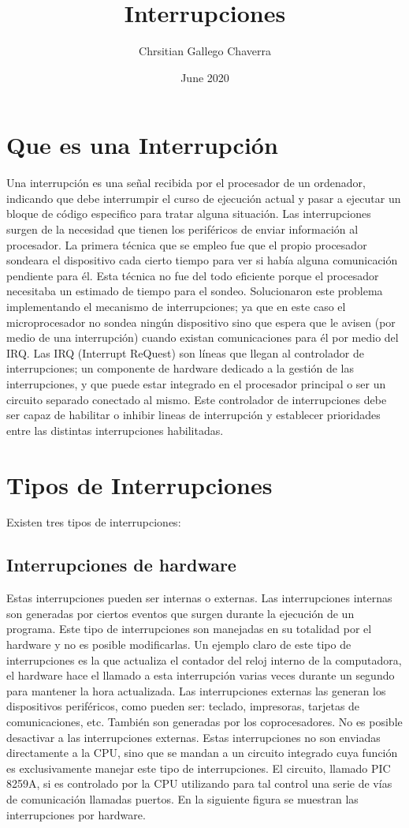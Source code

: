 \documentclass{article}
\title{Interrupciones}
\author{Chrsitian Gallego Chaverra}
\date{June 2020}
\begin{document}
\maketitle

\section{Que es una Interrupción}
Una interrupción es una señal recibida por el procesador de un ordenador, indicando que debe interrumpir el curso de ejecución actual y pasar a ejecutar un bloque de código especifico para tratar alguna situación.\cite{def}
Las interrupciones surgen de la necesidad que tienen los periféricos de enviar información al procesador. La primera técnica que se empleo fue que el propio procesador sondeara el dispositivo cada cierto tiempo para ver si había alguna comunicación pendiente para él. Esta técnica no fue del todo eficiente porque el procesador necesitaba un estimado de tiempo para el sondeo. Solucionaron este problema implementando el mecanismo de interrupciones; ya que en este caso el microprocesador no sondea ningún dispositivo sino que espera que le avisen (por medio de una interrupción) cuando existan comunicaciones para él por medio del IRQ. Las IRQ (Interrupt ReQuest) son líneas que llegan al controlador de interrupciones; un componente de hardware dedicado a la gestión de las interrupciones, y que puede estar integrado en el procesador principal o ser un circuito separado conectado al mismo. Este controlador de interrupciones debe ser capaz de habilitar o inhibir lineas de interrupción y establecer prioridades entre las distintas interrupciones habilitadas. 

\section{Tipos de Interrupciones}
Existen tres tipos de interrupciones:
\subsection{Interrupciones de hardware}
Estas interrupciones pueden ser internas o externas.
Las interrupciones internas son generadas por ciertos eventos que surgen durante la ejecución de un programa.
Este tipo de interrupciones son manejadas en su totalidad por el hardware y no es posible modificarlas.
Un ejemplo claro de este tipo de interrupciones es la que actualiza el contador del reloj interno de la computadora, el hardware hace el llamado a esta interrupción varias veces durante un segundo para mantener la hora actualizada.
Las interrupciones externas las generan los dispositivos periféricos, como pueden ser: teclado, impresoras, tarjetas de comunicaciones, etc. También son generadas por los coprocesadores.
No es posible desactivar a las interrupciones externas.
Estas interrupciones no son enviadas directamente a la CPU, sino que se mandan a un circuito integrado cuya función es exclusivamente manejar este tipo de interrupciones. El circuito, llamado PIC 8259A\cite{8259}, si es controlado por la CPU utilizando para tal control una serie de vías de comunicación llamadas puertos. En la siguiente figura se muestran las interrupciones por hardware.
\end{document}
